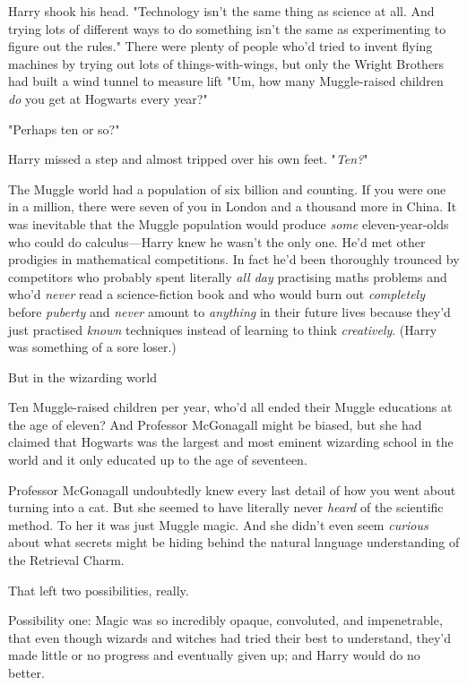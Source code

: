 Harry shook his head. "Technology isn't the same thing as science at all. And
trying lots of different ways to do something isn't the same as experimenting
to figure out the rules." There were plenty of people who'd tried to invent
flying machines by trying out lots of things-with-wings, but only the Wright
Brothers had built a wind tunnel to measure lift{\el} "Um, how many
Muggle-raised children \emph{do} you get at Hogwarts every year?"

"Perhaps ten or so?"

Harry missed a step and almost tripped over his own feet. "\emph{Ten?}"

The Muggle world had a population of six billion and counting. If you were one
in a million, there were seven of you in London and a thousand more in China.
It was inevitable that the Muggle population would produce \emph{some}
eleven-year-olds who could do calculus—Harry knew he wasn't the only one.
He'd met other prodigies in mathematical competitions. In fact he'd been
thoroughly trounced by competitors who probably spent literally \emph{all day}
practising maths problems and who'd \emph{never} read a science-fiction book
and who would burn out \emph{completely} before \emph{puberty} and \emph{never}
amount to \emph{anything} in their future lives because they'd just practised
\emph{known} techniques instead of learning to think \emph{creatively}. (Harry
was something of a sore loser.)

But{\el} in the wizarding world{\el}

Ten Muggle-raised children per year, who'd all ended their Muggle educations at
the age of eleven? And Professor McGonagall might be biased, but she had
claimed that Hogwarts was the largest and most eminent wizarding school in the
world{\el} and it only educated up to the age of seventeen.

Professor McGonagall undoubtedly knew every last detail of how you went about
turning into a cat. But she seemed to have literally never \emph{heard} of the
scientific method. To her it was just Muggle magic. And she didn't even seem
\emph{curious} about what secrets might be hiding behind the natural language
understanding of the Retrieval Charm.

That left two possibilities, really.

Possibility one: Magic was so incredibly opaque, convoluted, and impenetrable,
that even though wizards and witches had tried their best to understand, they'd
made little or no progress and eventually given up; and Harry would do no
better.

